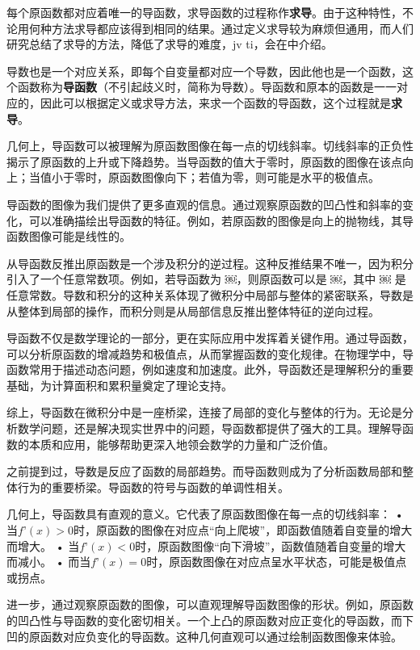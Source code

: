 每个原函数都对应着唯一的导函数，求导函数的过程称作\textbf{求导}。由于这种特性，不论用何种方法求导都应该得到相同的结果。通过定义求导较为麻烦但通用，而人们研究总结了求导的方法，降低了求导的难度，jv ti，会在中介绍。

导数也是一个对应关系，即每个自变量都对应一个导数，因此他也是一个函数，这个函数称为\textbf{导函数}（不引起歧义时，简称为导数）。导函数和原本的函数是一一对应的，因此可以根据定义或求导方法，来求一个函数的导函数，这个过程就是\textbf{求导}。


几何上，导函数可以被理解为原函数图像在每一点的切线斜率。切线斜率的正负性揭示了原函数的上升或下降趋势。当导函数的值大于零时，原函数的图像在该点向上；当值小于零时，原函数图像向下；若值为零，则可能是水平的极值点。

导函数的图像为我们提供了更多直观的信息。通过观察原函数的凹凸性和斜率的变化，可以准确描绘出导函数的特征。例如，若原函数的图像是向上的抛物线，其导函数图像可能是线性的。

从导函数反推出原函数是一个涉及积分的逆过程。这种反推结果不唯一，因为积分引入了一个任意常数项。例如，若导函数为 ￼，则原函数可以是 ￼，其中 ￼ 是任意常数。导数和积分的这种关系体现了微积分中局部与整体的紧密联系，导数是从整体到局部的操作，而积分则是从局部信息反推出整体特征的逆向过程。

导函数不仅是数学理论的一部分，更在实际应用中发挥着关键作用。通过导函数，可以分析原函数的增减趋势和极值点，从而掌握函数的变化规律。在物理学中，导函数常用于描述动态问题，例如速度和加速度。此外，导函数还是理解积分的重要基础，为计算面积和累积量奠定了理论支持。

综上，导函数在微积分中是一座桥梁，连接了局部的变化与整体的行为。无论是分析数学问题，还是解决现实世界中的问题，导函数都提供了强大的工具。理解导函数的本质和应用，能够帮助更深入地领会数学的力量和广泛价值。


之前提到过，导数是反应了函数的局部趋势。而导函数则成为了分析函数局部和整体行为的重要桥梁。导函数的符号与函数的单调性相关。

几何上，导函数具有直观的意义。它代表了原函数图像在每一点的切线斜率：
	•	当$f’(x) > 0$时，原函数的图像在对应点“向上爬坡”，即函数值随着自变量的增大而增大。
	•	当$f’(x) < 0$时，原函数图像“向下滑坡”，函数值随着自变量的增大而减小。
	•	而当$f’(x) = 0$时，原函数图像在对应点呈水平状态，可能是极值点或拐点。

进一步，通过观察原函数的图像，可以直观理解导函数图像的形状。例如，原函数的凹凸性与导函数的变化密切相关。一个上凸的原函数对应正变化的导函数，而下凹的原函数对应负变化的导函数。这种几何直观可以通过绘制函数图像来体验。

